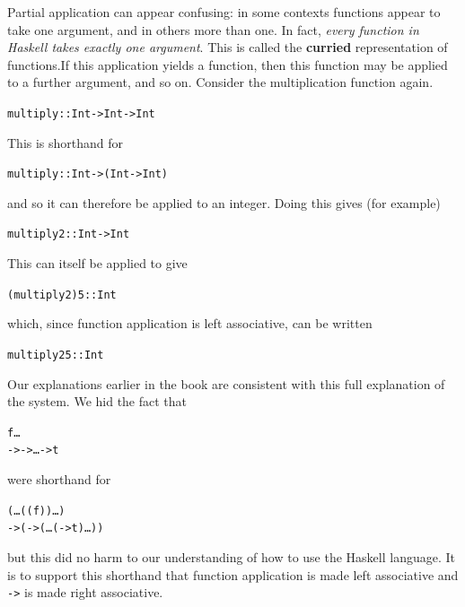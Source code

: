 Partial application can appear confusing: in some contexts functions appear
to take one argument, and in others more than one. In fact, {\em every function in
Haskell takes exactly one argument}. This is called the \textbf{curried} representation of functions.If this application yields a function,
then this function may be applied to a further argument, and so on.
Consider the multiplication
function again. 
\begin{alltt} 
multiply :: Int -> Int -> Int
\end{alltt}
This is shorthand for
\begin{alltt} 
multiply :: Int -> (Int -> Int)
\end{alltt}
and so it can therefore be applied to an integer. Doing this
gives (for example)
\begin{alltt}
multiply 2 :: Int -> Int
\end{alltt}
This can
itself be applied to give
\begin{alltt}
(multiply 2) 5 :: Int
\end{alltt}
which, since function application is left associative, can be written 
\begin{alltt}
multiply 2 5 :: Int
\end{alltt}
Our explanations earlier in the book are consistent with this full explanation
of the system. We hid the fact that
\begin{alltt}
f \eone \etwo \ldots {}
\tone -> \ttwo -> \ldots \tn -> t
\end{alltt}
were shorthand for
\begin{alltt}
( \ldots((f \eone) \etwo) \ldots {})
\tone -> (\ttwo -> (\ldots(\tn -> t)\ldots))
\end{alltt}
but this did no harm to our understanding of how to use the Haskell
language. It is to support this shorthand that function application is
made left associative and \texttt{->} is made right associative.

\begin{figure}[t]
\end{figure}

